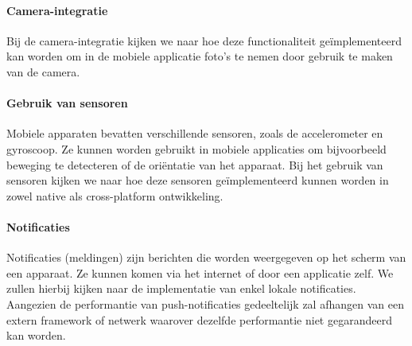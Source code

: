 \paragraph{Camera-integratie}
Bij de camera-integratie kijken we naar hoe deze functionaliteit geïmplementeerd kan 
worden om in de mobiele applicatie foto's te nemen door gebruik te maken van de camera.

\paragraph{Gebruik van sensoren}
Mobiele apparaten bevatten verschillende sensoren, zoals de accelerometer en gyroscoop. 
Ze kunnen worden gebruikt in mobiele applicaties om bijvoorbeeld beweging te detecteren 
of de oriëntatie van het apparaat. Bij het gebruik van sensoren kijken we naar hoe deze 
sensoren geïmplementeerd kunnen worden in zowel native als cross-platform ontwikkeling.

\paragraph{Notificaties}
Notificaties (meldingen) zijn berichten die worden weergegeven op het scherm van een 
apparaat. Ze kunnen komen via het internet of door een applicatie zelf. We zullen hierbij 
kijken naar de implementatie van enkel lokale notificaties. Aangezien de performantie van 
push-notificaties gedeeltelijk zal afhangen van een extern framework of netwerk waarover 
dezelfde performantie niet gegarandeerd kan worden.



